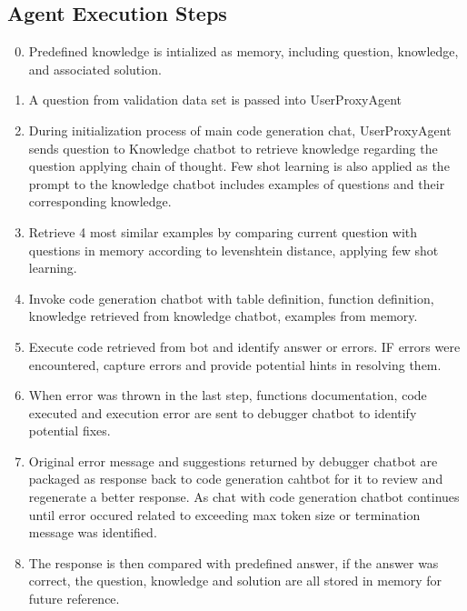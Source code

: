 \documentclass[screen,review]{acmart}
\begin{document}
\subsection{Agent Execution Steps}
\begin{enumerate}
  \setcounter{enumi}{-1}
  \item Predefined knowledge is intialized as memory, including question, knowledge, and associated solution.
  \item A question from validation data set is passed into UserProxyAgent 
  \item During initialization process of main code generation chat, UserProxyAgent sends question to Knowledge 
  chatbot to retrieve knowledge regarding the question applying chain of thought. Few shot learning is also 
  applied as the prompt to the knowledge chatbot includes examples of questions and their corresponding knowledge. 
  \item Retrieve 4 most similar examples by comparing current question with questions in memory according to 
  levenshtein distance, applying few shot learning.
  \item Invoke code generation chatbot with table definition, function definition, knowledge retrieved from 
  knowledge chatbot, examples from memory.
  \item Execute code retrieved from bot and identify answer or errors. IF errors were encountered, 
  capture errors and provide potential hints in resolving them.
  \item When error was thrown in the last step, functions documentation, code executed and execution error 
  are sent to debugger chatbot to identify potential fixes.
  \item Original error message and suggestions returned by debugger chatbot are packaged as response back to 
  code generation cahtbot for it to review and regenerate a better response. As chat with code generation 
  chatbot continues until error occured related to exceeding max token size or termination message was identified.
  \item The response is then compared with predefined answer, if the answer was correct, the question, knowledge 
  and solution are all stored in memory for future reference.
\end{enumerate}
\end{document}
